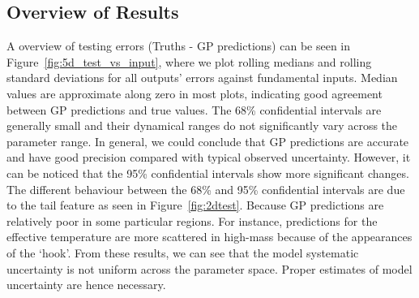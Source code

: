\subsection{Overview of Results}

A overview of testing errors (Truths - GP predictions) can be seen in Figure~\ref{fig:5d_test_vs_input}, where we plot rolling medians and rolling standard deviations for all outputs' errors against fundamental inputs.
%
Median values are approximate along zero in most plots, indicating good agreement between GP predictions and true values. The 68\% confidential intervals are generally small and their dynamical ranges do not significantly vary across the parameter range. In general, we could conclude that GP predictions are accurate and have good precision compared with typical observed uncertainty.
%
However, it can be noticed that the 95\% confidential intervals show more significant changes. The different behaviour between the  68\% and 95\% confidential intervals are due to the tail feature as seen in Figure~\ref{fig:2dtest}. Because GP predictions are relatively poor in some particular regions. For instance, predictions for the effective temperature are more scattered in high-mass because of the appearances of the `hook'. 
%
From these results, we can see that the model systematic uncertainty is not uniform across the parameter space. Proper estimates of model uncertainty are hence necessary. 


